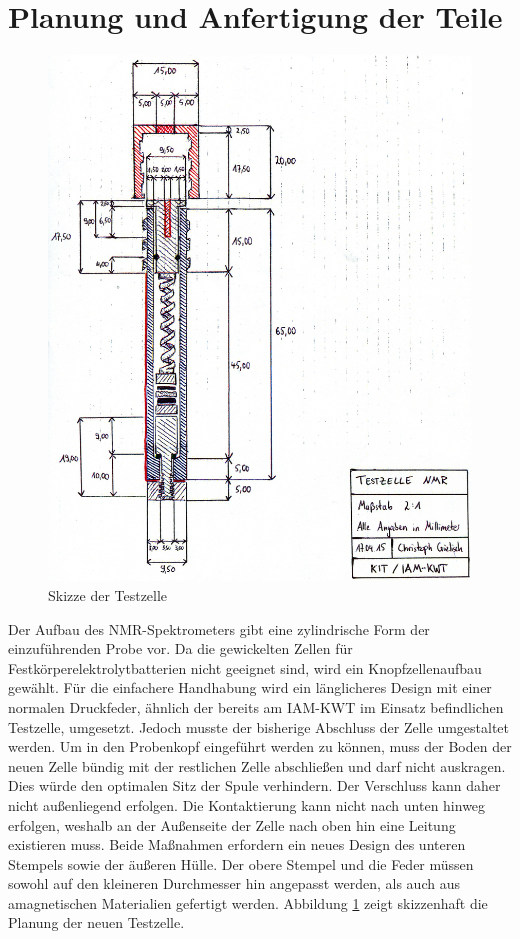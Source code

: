 \documentclass[a4paper, 11pt, headsepline,footsepline,twoside,abstract]{scrbook}
\begin{document}
\section{Planung und Anfertigung der Teile}
\begin{figure}
	\centering
	\includegraphics[width=1.0\columnwidth]{images/Skizze_Testzelle.jpg}
	\caption{Skizze der Testzelle}
	\label{skizze_testzelle}
\end{figure}
Der Aufbau des NMR-Spektrometers gibt eine zylindrische Form der einzuführenden Probe vor. Da die gewickelten Zellen für Festkörperelektrolytbatterien nicht geeignet sind, wird ein Knopfzellenaufbau gewählt. Für die einfachere Handhabung wird ein länglicheres Design mit einer normalen Druckfeder, ähnlich der bereits am IAM-KWT im Einsatz befindlichen Testzelle, umgesetzt. Jedoch musste der bisherige Abschluss der Zelle umgestaltet werden. Um in den Probenkopf eingeführt werden zu können, muss der Boden der neuen Zelle bündig mit der restlichen Zelle abschließen und darf nicht auskragen. Dies würde den optimalen Sitz der Spule verhindern. Der Verschluss kann daher nicht außenliegend erfolgen. Die Kontaktierung kann nicht nach unten hinweg erfolgen, weshalb an der Außenseite der Zelle nach oben hin eine Leitung existieren muss. Beide Maßnahmen erfordern ein neues Design des unteren Stempels sowie der äußeren Hülle. Der obere Stempel und die Feder müssen sowohl auf den kleineren Durchmesser hin angepasst werden, als auch aus amagnetischen Materialien gefertigt werden. Abbildung \ref{skizze_testzelle} zeigt skizzenhaft die Planung der neuen Testzelle.
\end{document}
